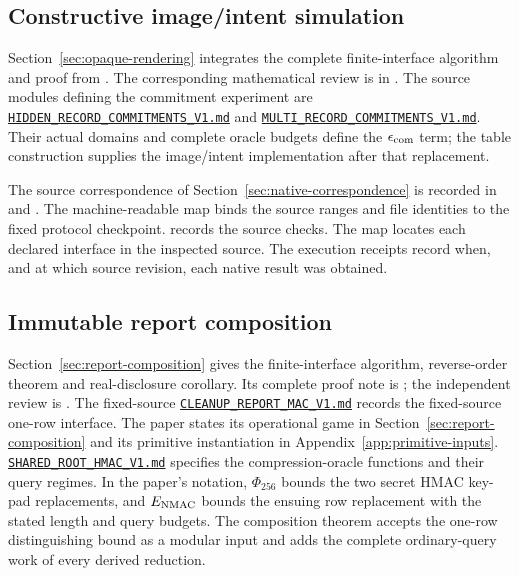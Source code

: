 \subsection{Constructive image/intent simulation}
\label{app:opaque-artifacts}

Section~\ref{sec:opaque-rendering} integrates the complete finite-interface
algorithm and proof from .
The corresponding mathematical review is in
. The source
modules defining the commitment experiment are
\href{https://github.com/billlza/q-periapt/blob/228c944fc476e3e57d6c08063cacb19bca5b360e/docs/continuity/HIDDEN_RECORD_COMMITMENTS_V1.md}{\nolinkurl{HIDDEN_RECORD_COMMITMENTS_V1.md}}
and
\href{https://github.com/billlza/q-periapt/blob/228c944fc476e3e57d6c08063cacb19bca5b360e/docs/continuity/MULTI_RECORD_COMMITMENTS_V1.md}{\nolinkurl{MULTI_RECORD_COMMITMENTS_V1.md}}.
Their actual domains and complete oracle budgets define the
$\epsilon_{\rm com}$ term; the table construction supplies the
image/intent implementation after that replacement.

The source correspondence of Section~\ref{sec:native-correspondence} is
recorded in  and
. The machine-readable map binds
the source ranges and file identities to the fixed protocol checkpoint.
 records the
source checks. The map locates each declared interface in the inspected
source. The execution receipts record when, and at which source revision,
each native result was obtained.

\subsection{Immutable report composition}
\label{app:report-artifacts}

Section~\ref{sec:report-composition} gives the finite-interface algorithm,
reverse-order theorem and real-disclosure corollary. Its complete proof note
is ; the independent
review is .
The fixed-source
\href{https://github.com/billlza/q-periapt/blob/228c944fc476e3e57d6c08063cacb19bca5b360e/docs/continuity/CLEANUP_REPORT_MAC_V1.md}{\nolinkurl{CLEANUP_REPORT_MAC_V1.md}}
records the fixed-source one-row interface. The paper states its operational
game in Section~\ref{sec:report-composition} and its primitive instantiation
in Appendix~\ref{app:primitive-inputs}.
\href{https://github.com/billlza/q-periapt/blob/228c944fc476e3e57d6c08063cacb19bca5b360e/docs/continuity/SHARED_ROOT_HMAC_V1.md}{\nolinkurl{SHARED_ROOT_HMAC_V1.md}}
specifies the compression-oracle functions and their query regimes.
In the paper's notation, $\Phi_{256}$ bounds the two secret HMAC key-pad
replacements, and $E_{\rm NMAC}$ bounds the ensuing row replacement with
the stated length and query budgets. The composition theorem accepts the
one-row distinguishing bound as a modular input and adds the complete
ordinary-query work of every derived reduction.

